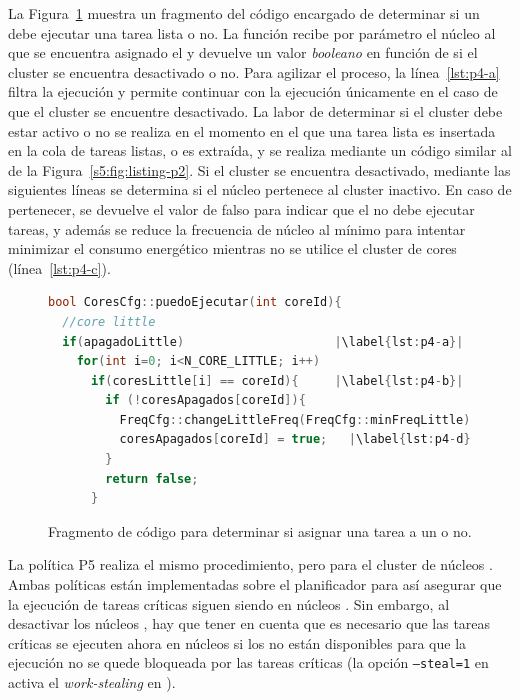 La Figura~\ref{fig:P4-puedo-ejecutar} muestra un fragmento del código
encargado de determinar si un \wt debe ejecutar una tarea lista o no. La
función recibe por parámetro el núcleo al que se encuentra asignado el \wt
y devuelve un valor \emph{booleano} en función de si el cluster se
encuentra desactivado o no. Para agilizar el proceso, la
línea~\ref{lst:p4-a} filtra la ejecución y permite continuar con la
ejecución únicamente en el caso de que el cluster se encuentre
desactivado. La labor de determinar si el cluster debe estar activo o no se
realiza en el momento en el que una tarea lista es insertada en la cola de
tareas listas, o es extraída, y se realiza mediante un código similar
al de la Figura~\ref{s5:fig:listing-p2}. Si el cluster se encuentra
desactivado, mediante las siguientes líneas se determina si el núcleo
pertenece al cluster inactivo. En caso de pertenecer, se devuelve el
valor de falso para indicar que el \wt no debe ejecutar tareas, y además
se reduce la frecuencia de núcleo al mínimo para intentar minimizar el
consumo energético mientras no se utilice el cluster de cores \LITTLE
(línea~\ref{lst:p4-c}).


\begin{figure}
  \centering
\begin{lstlisting}[language=C++]
bool CoresCfg::puedoEjecutar(int coreId){
  //core little
  if(apagadoLittle)                     |\label{lst:p4-a}|
    for(int i=0; i<N_CORE_LITTLE; i++)
      if(coresLittle[i] == coreId){     |\label{lst:p4-b}|
        if (!coresApagados[coreId]){
          FreqCfg::changeLittleFreq(FreqCfg::minFreqLittle); |\label{lst:p4-c}|
          coresApagados[coreId] = true;   |\label{lst:p4-d}|
        }
        return false;
      }
\end{lstlisting}
  \caption{Fragmento de código para determinar si asignar una tarea a un
    \wt o no.}
  \label{fig:P4-puedo-ejecutar}
\end{figure}

La política P5 realiza el mismo procedimiento, pero para el cluster de
núcleos \BIG. Ambas políticas están implementadas sobre el planificador \botlev
para así asegurar que la ejecución de tareas críticas siguen siendo en
núcleos \BIG. Sin embargo, al desactivar los núcleos \BIG, hay que tener en cuenta
que es necesario que las tareas críticas se ejecuten ahora en núcleos \LITTLE si los
\BIG no están disponibles para que la ejecución no se quede bloqueada por
las tareas críticas (la opción \texttt{--steal=1} en \botlev activa el {\em work-stealing}
en \nanos).

